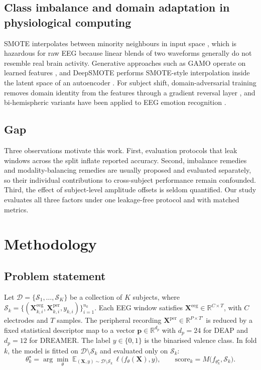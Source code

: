 \documentclass[a4paper,fleqn]{cas-sc}
\begin{document}
\subsection{Class imbalance and domain adaptation in physiological computing}
SMOTE interpolates between minority neighbours in input space \citep{chawla2002smote}, which is hazardous for raw EEG because linear blends of two waveforms generally do not resemble real brain activity. Generative approaches such as GAMO operate on learned features \citep{mullick2019gamo}, and DeepSMOTE performs SMOTE-style interpolation inside the latent space of an autoencoder \citep{dablain2023deepsmote}. For subject shift, domain-adversarial training removes domain identity from the features through a gradient reversal layer \citep{ganin2016dann}, and bi-hemispheric variants have been applied to EEG emotion recognition \citep{li2021bidann}.

\subsection{Gap}
Three observations motivate this work. First, evaluation protocols that leak windows across the split inflate reported accuracy. Second, imbalance remedies and modality-balancing remedies are usually proposed and evaluated separately, so their individual contributions to cross-subject performance remain confounded. Third, the effect of subject-level amplitude offsets is seldom quantified. Our study evaluates all three factors under one leakage-free protocol and with matched metrics.

\section{Methodology}
\label{sec:method}

\subsection{Problem statement}
Let $\mathcal{D}=\{\mathcal{S}_1,\dots,\mathcal{S}_K\}$ be a collection of $K$ subjects, where $\mathcal{S}_k=\{(\mathbf{X}^{\mathrm{eeg}}_{k,i},\mathbf{X}^{\mathrm{per}}_{k,i},y_{k,i})\}_{i=1}^{n_k}$. Each EEG window satisfies $\mathbf{X}^{\mathrm{eeg}}\in\mathbb{R}^{C\times T}$, with $C$ electrodes and $T$ samples. The peripheral recording $\mathbf{X}^{\mathrm{per}}\in\mathbb{R}^{P\times T'}$ is reduced by a fixed statistical descriptor map to a vector $\mathbf{p}\in\mathbb{R}^{d_p}$ with $d_p=24$ for DEAP and $d_p=12$ for DREAMER. The label $y\in\{0,1\}$ is the binarised valence class. In fold $k$, the model is fitted on $\mathcal{D}\setminus\mathcal{S}_k$ and evaluated only on $\mathcal{S}_k$:
\begin{equation}
\theta_k^\star=\arg\min_{\theta}\;\mathbb{E}_{(\mathbf{X},y)\sim\mathcal{D}\setminus\mathcal{S}_k}\,\ell\bigl(f_\theta(\mathbf{X}),y\bigr),\qquad
\text{score}_k=M\bigl(f_{\theta_k^\star},\mathcal{S}_k\bigr).
\end{equation}
\end{document}
